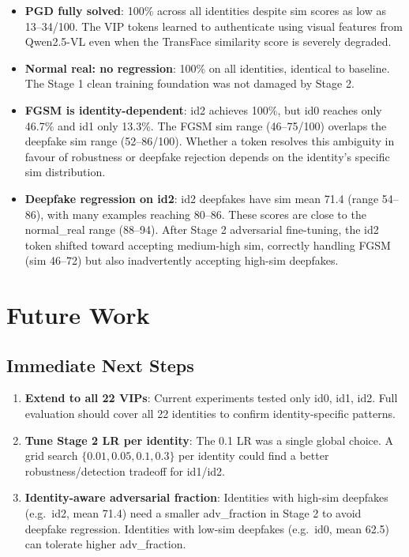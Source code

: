 \documentclass[12pt,a4paper]{article}
\begin{document}
\begin{itemize}
    \item \textbf{PGD fully solved}: 100\% across all identities despite sim scores as low as
    13--34/100. The VIP tokens learned to authenticate using visual features from
    Qwen2.5-VL even when the TransFace similarity score is severely degraded.

    \item \textbf{Normal real: no regression}: 100\% on all identities, identical to baseline.
    The Stage 1 clean training foundation was not damaged by Stage 2.

    \item \textbf{FGSM is identity-dependent}: id2 achieves 100\%, but id0 reaches only 46.7\%
    and id1 only 13.3\%.  The FGSM sim range (46--75/100) overlaps the deepfake sim range
    (52--86/100). Whether a token resolves this ambiguity in favour of robustness or
    deepfake rejection depends on the identity's specific sim distribution.

    \item \textbf{Deepfake regression on id2}: id2 deepfakes have sim mean 71.4 (range
    54--86), with many examples reaching 80--86. These scores are close to the normal\_real
    range (88--94). After Stage 2 adversarial fine-tuning, the id2 token shifted toward
    accepting medium-high sim, correctly handling FGSM (sim 46--72) but also inadvertently
    accepting high-sim deepfakes.
\end{itemize}

\section{Future Work}

\subsection{Immediate Next Steps}

\begin{enumerate}
    \item \textbf{Extend to all 22 VIPs}: Current experiments tested only id0, id1, id2. Full evaluation should cover all 22 identities to confirm identity-specific patterns.

    \item \textbf{Tune Stage 2 LR per identity}: The 0.1 LR was a single global choice. A grid search $\{0.01, 0.05, 0.1, 0.3\}$ per identity could find a better robustness/detection tradeoff for id1/id2.

    \item \textbf{Identity-aware adversarial fraction}: Identities with high-sim deepfakes (e.g.\ id2, mean 71.4) need a smaller adv\_fraction in Stage 2 to avoid deepfake regression. Identities with low-sim deepfakes (e.g.\ id0, mean 62.5) can tolerate higher adv\_fraction.
\end{enumerate}
\end{document}
